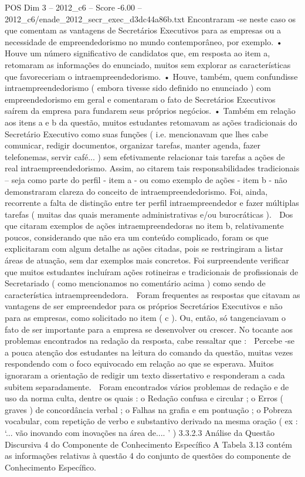 \begin{textsample}{POS Dim 3 – 2012\_c6 – Score -6.00 – 2012\_c6/enade\_2012\_secr\_exec\_d3dc44a86b.txt}
Encontraram -se neste caso os que comentam as vantagens de Secretários Executivos para as empresas ou a necessidade de empreendedorismo no mundo contemporâneo, por exemplo. • Houve um número significativo de candidatos que, em resposta ao item a, retomaram as informações do enunciado, muitos sem explorar as características que favoreceriam o intraempreendedorismo. • Houve, também, quem confundisse intraempreendedorismo ( embora tivesse sido definido no enunciado ) com empreendedorismo em geral e comentaram o fato de Secretários Executivos saírem da empresa para fundarem seus próprios negócios. • Também em relação aos itens a e b da questão, muitos estudantes retomavam as ações tradicionais do Secretário Executivo como suas funções ( i.e. mencionavam que lhes cabe comunicar, redigir documentos, organizar tarefas, manter agenda, fazer telefonemas, servir café... ) sem efetivamente relacionar tais tarefas a ações de real intraempreendedorismo.
Assim, ao citarem tais responsabilidades tradicionais – seja como parte do perfil - item a - ou como exemplo de ações - item b - não demonstraram clareza do conceito de intraempreendedorismo.
Foi, ainda, recorrente a falta de distinção entre ter perfil intraempreendedor e fazer múltiplas tarefas ( muitas das quais meramente administrativas e/ou burocráticas ).  Dos que citaram exemplos de ações intraempreendedoras no item b, relativamente poucos, considerando que não era um conteúdo complicado, foram os que explicitaram com algum detalhe as ações citadas, pois se restringiram a listar áreas de atuação, sem dar exemplos mais concretos.
Foi surpreendente verificar que muitos estudantes incluíram ações rotineiras e tradicionais de profissionais de Secretariado ( como mencionamos no comentário acima ) como sendo de característica intraempreendedora.  Foram frequentes as respostas que citavam as vantagens de ser empreendedor para os próprios Secretários Executivos e não para as empresas, como solicitado no item ( c ).
Ou, então, só tangenciavam o fato de ser importante para a empresa se desenvolver ou crescer.
No tocante aos problemas encontrados na redação da resposta, cabe ressaltar que :  Percebe -se a pouca atenção dos estudantes na leitura do comando da questão, muitas vezes respondendo com o foco equivocado em relação ao que se esperava.
Muitos ignoraram a orientação de redigir um texto dissertativo e responderam a cada subitem separadamente.  Foram encontrados vários problemas de redação e de uso da norma culta, dentre os quais : o Redação confusa e circular ; o Erros ( graves ) de concordância verbal ; o Falhas na grafia e em pontuação ; o Pobreza vocabular, com repetição de verbo e substantivo derivado na mesma oração ( ex : ‘... vão inovando com inovações na área de.... ’ ) 3.3.2.3 Análise da Questão Discursiva 4 do Componente de Conhecimento Específico A Tabela 3.13 contém as informações relativas à questão 4 do conjunto de questões do componente de Conhecimento Específico.

\end{textsample}
